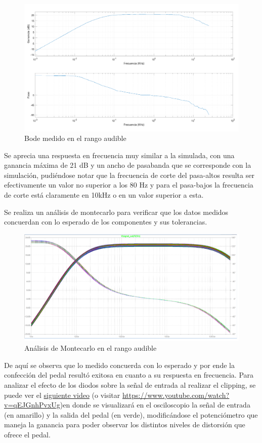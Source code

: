 \documentclass[../../main.tex]{subfiles}
\begin{document}
\begin{figure}[H]
	\centering
	\includegraphics[scale=.2]{imagenes/bode_mediciones.png}
	\caption{Bode medido en el rango audible}
	\label{fig:ej5_bode_mediciones}
\end{figure}

Se aprecia una respuesta en frecuencia muy similar a la simulada, con una ganancia máxima de 21 dB y un ancho de pasabanda que se corresponde con la simulación, pudiéndose notar que la frecuencia de corte del pasa-altos resulta ser efectivamente un valor no superior a los 80 Hz y para el pasa-bajos la frecuencia de corte está claramente en 10kHz o en un valor superior a esta. \par

Se realiza un análisis de montecarlo para verificar que los datos medidos concuerdan con lo esperado de los componentes y sus tolerancias. 

\begin{figure}[H]
	\centering
	\includegraphics[scale=.2]{imagenes/pedal_montecarlo.png}
	\caption{Análisis de Montecarlo en el rango audible}
	\label{fig:ej5_pedal_montecarlo}
\end{figure}
 
De aquí se observa que lo medido concuerda con lo esperado y por ende la confección del pedal resultó exitosa en cuanto a su respuesta en frecuencia. Para analizar el efecto de los diodos sobre la señal de entrada al realizar el clipping, se puede ver el  \href{https://www.youtube.com/watch?v=qEJGnhPvxUg}{siguiente video} (o visitar \url{https://www.youtube.com/watch?v=qEJGnhPvxUg})en donde se visualizará en el osciloscopio la señal de entrada (en amarillo) y la salida del pedal (en verde), modificándose el potenciómetro que maneja la ganancia para poder observar los distintos niveles de distorsión que ofrece el pedal.
\end{document}
